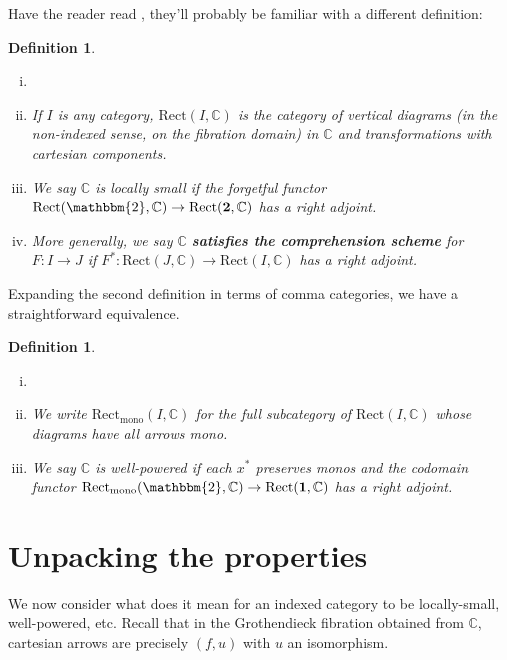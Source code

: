 \documentclass[10pt, oneside]{article}
\newtheorem{definition}[theorem]{Definition}
\begin{document}
Have the reader read \cite{Johnstone2002}, they'll probably be familiar with a different definition:

\begin{definition}
    \begin{enumerate}[i)]
    \item[]
        \item If $I$ is any category, $\mathrm{Rect}(I, \mathbb{C})$ is the category of vertical diagrams (in the non-indexed sense, on the fibration domain) in $\mathbb{C}$ and transformations with cartesian components.

        \item We say $\mathbb{C}$ is locally small if the forgetful functor $\mathrm{Rect}(\mathbbm{2}, \mathbb{C}) \to \mathrm{Rect}(\mathbf{2}, \mathbb{C})$ has a right adjoint.

        \item More generally, we say $\mathbb{C}$ \textbf{satisfies the comprehension scheme} for $F: I \to J$ if $F^\ast: \mathrm{Rect}(J, \mathbb{C}) \to \mathrm{Rect}(I, \mathbb{C})$ has a right adjoint.
    \end{enumerate}
\end{definition}

Expanding the second definition in terms of comma categories, we have a straightforward equivalence.

\begin{definition}
    \begin{enumerate}[i)]
    \item[]
        \item We write $\mathrm{Rect}_\text{mono}(I, \mathbb{C})$ for the full subcategory of $\mathrm{Rect}(I, \mathbb{C})$ whose diagrams have all arrows mono.

        \item We say $\mathbb{C}$ is well-powered if each $x^\ast$ preserves monos and the codomain functor $\mathrm{Rect}_\text{mono}(\mathbbm{2}, \mathbb{C}) \to \mathrm{Rect}(\mathbf{1}, \mathbb{C})$ has a right adjoint.
    \end{enumerate}
\end{definition}

\section{Unpacking the properties}

We now consider what does it mean for an indexed category to be locally-small, well-powered, etc. Recall that in the Grothendieck fibration obtained from $\mathbb{C}$, cartesian arrows are precisely $(f, u)$ with $u$ an isomorphism.
\end{document}
